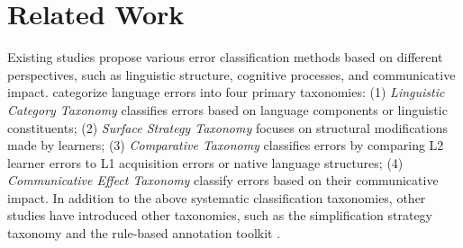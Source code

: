 \section{Related Work}
Existing studies propose various error classification methods based on different perspectives, such as linguistic structure, cognitive processes, and communicative impact. \citet{language_two} categorize language errors into four primary taxonomies: 
(1) \textit{Linguistic Category Taxonomy} \citep{linguistic_one,gooficon,linguistic_three} classifies errors based on language components or linguistic constituents;
(2) \textit{Surface Strategy Taxonomy} \citep{surface_one,surface_two,surface_three} focuses on structural modifications made by learners;
(3) \textit{Comparative Taxonomy} \citep{comparative_one,comparative_child,comparative_adult} classifies errors by comparing L2 learner errors to L1 acquisition errors or native language structures;
(4) \textit{Communicative Effect Taxonomy} \citep{communicative_one,communicative_two} classify errors based on their communicative impact. In addition to the above systematic classification taxonomies, other studies \citep{other_two,NUCLE,other_four,enhancing} have introduced other taxonomies, such as the simplification strategy taxonomy \citep{other_one} and the rule-based annotation toolkit \citep{errant,ye-etal-2023-cleme}.
